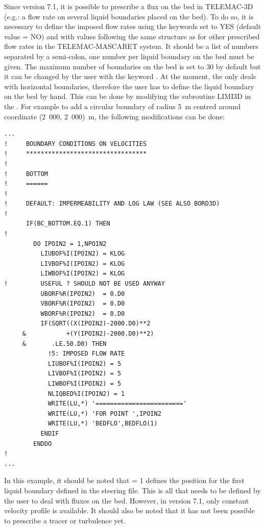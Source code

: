 Since version 7.1, it is possible to prescribe a flux on the bed in TELEMAC-3D
(e.g.: a flow rate on several liquid boundaries placed on the bed).
To do so, it is necessary to define the imposed flow rates using the keywords
 set to YES (default value = NO)
and  with values following the same
structure as for other prescribed flow rates in the TELEMAC-MASCARET system.
It should be a list of numbers separated by a semi-colon, one number per
liquid boundary on the bed must be given.
The maximum number of boundaries on the bed is set to 30 by default
but it can be changed by the user with the keyword .
At the moment, the  only deals with horizontal
boundaries, therefore the user has to define the liquid boundary on the bed by hand.
This can be done by modifying the subroutine LIMI3D in the .
For example to add a circular boundary of radius 5~m centred around coordinate
(2~000, 2~000)~m, the following modifications can be done:
\begin{lstlisting}[language=TelFortran]
...
!     BOUNDARY CONDITIONS ON VELOCITIES
!     *********************************
!
!     BOTTOM
!     ======
!
!     DEFAULT: IMPERMEABILITY AND LOG LAW (SEE ALSO BORD3D)
!
      IF(BC_BOTTOM.EQ.1) THEN
!
        DO IPOIN2 = 1,NPOIN2
          LIUBOF%I(IPOIN2) = KLOG
          LIVBOF%I(IPOIN2) = KLOG
          LIWBOF%I(IPOIN2) = KLOG
!         USEFUL ? SHOULD NOT BE USED ANYWAY
          UBORF%R(IPOIN2)  = 0.D0
          VBORF%R(IPOIN2)  = 0.D0
          WBORF%R(IPOIN2)  = 0.D0
          IF(SQRT((X(IPOIN2)-2000.D0)**2
     &           +(Y(IPOIN2)-2000.D0)**2)
     &       .LE.50.D0) THEN
            !5: IMPOSED FLOW RATE
            LIUBOF%I(IPOIN2) = 5
            LIVBOF%I(IPOIN2) = 5
            LIWBOF%I(IPOIN2) = 5
            NLIQBED%I(IPOIN2) = 1
            WRITE(LU,*) '========================'
            WRITE(LU,*) 'FOR POINT ',IPOIN2
            WRITE(LU,*) 'BEDFLO',BEDFLO(1)
          ENDIF
        ENDDO
!
...
\end{lstlisting}

In this example, it should be noted that  = 1
defines the position for the first liquid boundary defined in the steering file.
This is all that needs to be defined by the user to deal with fluxes on the bed.
However, in version 7.1, only constant velocity profile is available.
It should also be noted that it has not been possible to prescribe a tracer
or turbulence yet.

